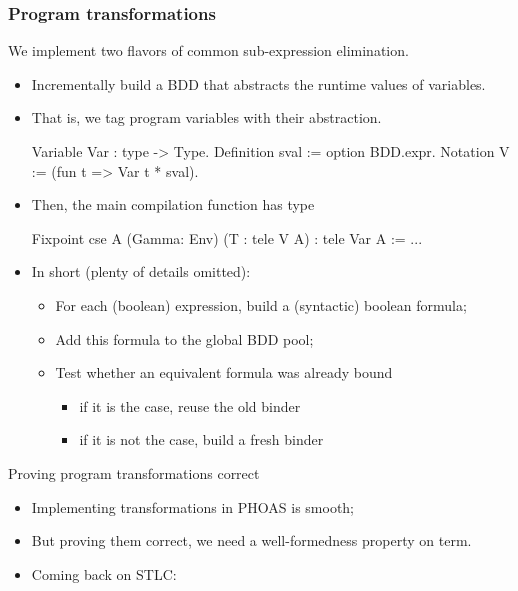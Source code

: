 \documentclass[9pt]{beamer}
\begin{document}
\begin{frame}[fragile]
  \frametitle{Program transformations}
  We implement two flavors of common sub-expression elimination. 
  \begin{itemize}
  \item Incrementally build a BDD that abstracts the runtime values of variables.
  \item That is, we \alert{tag} program variables with their abstraction.
\begin{coq}
Variable Var : type -> Type.
Definition sval := option BDD.expr.
Notation V := (fun t => Var t * sval).
\end{coq}
\item Then, the main compilation function has type
\begin{coq}
Fixpoint cse {A} (Gamma: Env) (T : tele V A) : tele Var A := ...
\end{coq}
\pause
\item In short (plenty of details omitted):
  \begin{itemize}
  \item For each (boolean) expression, build a (syntactic) boolean formula;
  \item Add this formula to the global BDD pool;
  \item Test whether an equivalent formula was already bound
    \begin{itemize}
    \item if it is the case, reuse the old binder
    \item if it is not the case, build a fresh binder
    \end{itemize}
  \end{itemize}
\end{itemize}
\end{frame}

\begin{frame}{Proving program transformations correct}
  \begin{itemize}
  \item Implementing transformations in PHOAS is smooth;
  \item But proving them correct, we need a well-formedness property
    on term.

  \item Coming back on STLC:

\begin{coq}
  
\end{coq}
  \end{itemize}
  
\end{frame}
\end{document}
